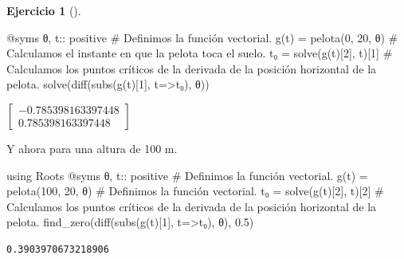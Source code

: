 \documentclass[
  a4paper,
]{scrreport}
\newenvironment{Shaded}{\begin{snugshade}}{\end{snugshade}}
\newcommand{\BuiltInTok}[1]{\textcolor[rgb]{0.00,0.23,0.31}{#1}}
\newcommand{\CommentTok}[1]{\textcolor[rgb]{0.37,0.37,0.37}{#1}}
\newcommand{\DataTypeTok}[1]{\textcolor[rgb]{0.68,0.00,0.00}{#1}}
\newcommand{\FloatTok}[1]{\textcolor[rgb]{0.68,0.00,0.00}{#1}}
\newcommand{\FunctionTok}[1]{\textcolor[rgb]{0.28,0.35,0.67}{#1}}
\newcommand{\ImportTok}[1]{\textcolor[rgb]{0.00,0.46,0.62}{#1}}
\newcommand{\NormalTok}[1]{\textcolor[rgb]{0.00,0.23,0.31}{#1}}
\newcommand{\OperatorTok}[1]{\textcolor[rgb]{0.37,0.37,0.37}{#1}}
\newcommand{\PreprocessorTok}[1]{\textcolor[rgb]{0.68,0.00,0.00}{#1}}
\theoremstyle{definition}
\newtheorem{exercise}{Ejercicio}[chapter]
\theoremstyle{remark}
\begin{document}
\begin{exercise}[]
\begin{enumerate}
\begin{tcolorbox}
\begin{Shaded}
\begin{Highlighting}[]
\PreprocessorTok{@syms}\NormalTok{ θ, t}\OperatorTok{::}\DataTypeTok{ positive}
\CommentTok{\# Definimos la función vectorial.}
\FunctionTok{g}\NormalTok{(t) }\OperatorTok{=} \FunctionTok{pelota}\NormalTok{(}\FloatTok{0}\NormalTok{, }\FloatTok{20}\NormalTok{, θ)}
\CommentTok{\# Calculamos el instante en que la pelota toca el suelo.}
\NormalTok{t₀ }\OperatorTok{=} \FunctionTok{solve}\NormalTok{(}\FunctionTok{g}\NormalTok{(t)[}\FloatTok{2}\NormalTok{], t)[}\FloatTok{1}\NormalTok{]}
\CommentTok{\# Calculamos los puntos críticos de la derivada de la posición horizontal de la pelota.}
\FunctionTok{solve}\NormalTok{(}\FunctionTok{diff}\NormalTok{(}\FunctionTok{subs}\NormalTok{(}\FunctionTok{g}\NormalTok{(t)[}\FloatTok{1}\NormalTok{], t}\OperatorTok{=\textgreater{}}\NormalTok{t₀), θ))}
\end{Highlighting}
\end{Shaded}

  $\left[\begin{smallmatrix}-0.785398163397448\\0.785398163397448\end{smallmatrix}\right]$

  Y ahora para una altura de 100 m.

\begin{Shaded}
\begin{Highlighting}[]
\ImportTok{using} \BuiltInTok{Roots}
\PreprocessorTok{@syms}\NormalTok{ θ, t}\OperatorTok{::}\DataTypeTok{ positive}
\CommentTok{\# Definimos la función vectorial.}
\FunctionTok{g}\NormalTok{(t) }\OperatorTok{=} \FunctionTok{pelota}\NormalTok{(}\FloatTok{100}\NormalTok{, }\FloatTok{20}\NormalTok{, θ)}
\CommentTok{\# Definimos la función vectorial.}
\NormalTok{t₀ }\OperatorTok{=} \FunctionTok{solve}\NormalTok{(}\FunctionTok{g}\NormalTok{(t)[}\FloatTok{2}\NormalTok{], t)[}\FloatTok{2}\NormalTok{]}
\CommentTok{\# Calculamos los puntos críticos de la derivada de la posición horizontal de la pelota.}
\FunctionTok{find\_zero}\NormalTok{(}\FunctionTok{diff}\NormalTok{(}\FunctionTok{subs}\NormalTok{(}\FunctionTok{g}\NormalTok{(t)[}\FloatTok{1}\NormalTok{], t}\OperatorTok{=\textgreater{}}\NormalTok{t₀), θ), }\FloatTok{0.5}\NormalTok{)}
\end{Highlighting}
\end{Shaded}

\begin{verbatim}
0.3903970673218906
\end{verbatim}


\end{tcolorbox}
\end{enumerate}
\end{exercise}
\end{document}
